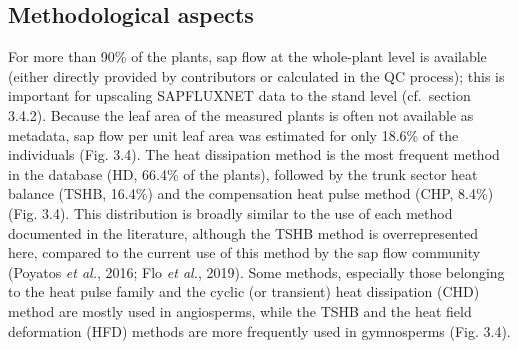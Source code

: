 \documentclass[11pt,twoside]{reedthesis}
\begin{document}
\subsection{Methodological aspects}\label{methodological-aspects}

For more than 90\% of the plants, sap flow at the whole-plant level is
available (either directly provided by contributors or calculated in the
QC process); this is important for upscaling SAPFLUXNET data to the
stand level (cf.~section 3.4.2). Because the leaf area of the measured
plants is often not available as metadata, sap flow per unit leaf area
was estimated for only 18.6\% of the individuals (Fig. 3.4). The heat
dissipation method is the most frequent method in the database (HD,
66.4\% of the plants), followed by the trunk sector heat balance (TSHB,
16.4\%) and the compensation heat pulse method (CHP, 8.4\%) (Fig. 3.4).
This distribution is broadly similar to the use of each method
documented in the literature, although the TSHB method is
overrepresented here, compared to the current use of this method by the
sap flow community (Poyatos \emph{et al.}, 2016; Flo \emph{et al.},
2019). Some methods, especially those belonging to the heat pulse family
and the cyclic (or transient) heat dissipation (CHD) method are mostly
used in angiosperms, while the TSHB and the heat field deformation (HFD)
methods are more frequently used in gymnosperms (Fig. 3.4).\par
\end{document}
